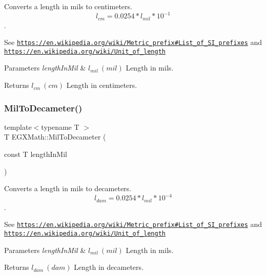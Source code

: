 Converts a length in mils to centimeters. \[ l_{cm}=0.0254* l_{mil} * 10^{-1} \]. 

See \href{https://en.wikipedia.org/wiki/Metric_prefix#List_of_SI_prefixes}{\tt https\+://en.\+wikipedia.\+org/wiki/\+Metric\+\_\+prefix\#\+List\+\_\+of\+\_\+\+S\+I\+\_\+prefixes} and \href{https://en.wikipedia.org/wiki/Unit_of_length}{\tt https\+://en.\+wikipedia.\+org/wiki/\+Unit\+\_\+of\+\_\+length} 
\begin{DoxyParams}{Parameters}
{\em length\+In\+Mil} & $ l_{mil}\ (mil)$ Length in mils. \\
\hline
\end{DoxyParams}
\begin{DoxyReturn}{Returns}
$ l_{cm}\ (cm)$ Length in centimeters. 
\end{DoxyReturn}
\mbox{\label{group___e_g_x_math-_conversions-_length_conversions-_imperial-_mil-_s_i_ga04eab639339270142a55aa2655fc0db8}} 
\subsubsection{\texorpdfstring{Mil\+To\+Decameter()}{MilToDecameter()}}
{\footnotesize\ttfamily template$<$typename T $>$ \\
T E\+G\+X\+Math\+::\+Mil\+To\+Decameter (\begin{DoxyParamCaption}\item[{const T}]{length\+In\+Mil }\end{DoxyParamCaption})}



Converts a length in mils to decameters. \[ l_{dam}=0.0254* l_{mil} * 10^{-4} \]. 

See \href{https://en.wikipedia.org/wiki/Metric_prefix#List_of_SI_prefixes}{\tt https\+://en.\+wikipedia.\+org/wiki/\+Metric\+\_\+prefix\#\+List\+\_\+of\+\_\+\+S\+I\+\_\+prefixes} and \href{https://en.wikipedia.org/wiki/Unit_of_length}{\tt https\+://en.\+wikipedia.\+org/wiki/\+Unit\+\_\+of\+\_\+length} 
\begin{DoxyParams}{Parameters}
{\em length\+In\+Mil} & $ l_{mil}\ (mil)$ Length in mils. \\
\hline
\end{DoxyParams}
\begin{DoxyReturn}{Returns}
$ l_{dam}\ (dam)$ Length in decameters. 
\end{DoxyReturn}
\mbox{\label{group___e_g_x_math-_conversions-_length_conversions-_imperial-_mil-_s_i_gadc0ea330185b0ab7569f25cbab72322d}} 
